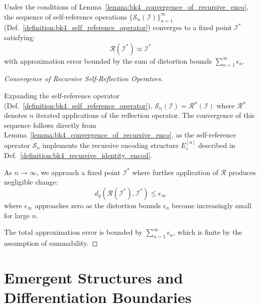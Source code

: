 \begin{theorem}
\label{theorem:bk4_fixed_points_of_self_refere}
Under the conditions of Lemma~\ref{lemma:bk4_convergence_of_recursive_enco}, the sequence of self-reference operations $\{\mathcal{S}_n(\mathcal{I})\}_{n=1}^{\infty}$ (Def.~\ref{definition:bk4_self_reference_operator}) converges to a fixed point $\mathcal{I}^*$ satisfying:
\begin{equation}
    \mathcal{R}(\mathcal{I}^*) \approx \mathcal{I}^*
\end{equation}
with approximation error bounded by the sum of distortion bounds $\sum_{n=1}^{\infty} \epsilon_n$.
\end{theorem}
\begin{proof}[Convergence of Recursive Self-Reflection Operators]
\label{proof:bk4_recursive_reflection_convergence}
\leavevmode

Expanding the self-reference operator (Def.~\ref{definition:bk4_self_reference_operator}), $\mathcal{S}_n(\mathcal{I}) = \mathcal{R}^n(\mathcal{I})$ where $\mathcal{R}^n$ denotes $n$ iterated applications of the reflection operator. The convergence of this sequence follows directly from Lemma~\ref{lemma:bk4_convergence_of_recursive_enco}, as the self-reference operator $\mathcal{S}_n$ implements the recursive encoding structure $E_i^{[n]}$ described in Def.~\ref{definition:bk4_recursive_identity_encod}.

As $n \to \infty$, we approach a fixed point $\mathcal{I}^*$ where further application of $\mathcal{R}$ produces negligible change:
\begin{equation}
    d_g(\mathcal{R}(\mathcal{I}^*), \mathcal{I}^*) \leq \epsilon_{\infty}
\end{equation}
where $\epsilon_{\infty}$ approaches zero as the distortion bounds $\epsilon_n$ become increasingly small for large $n$.

The total approximation error is bounded by $\sum_{n=1}^{\infty} \epsilon_n$, which is finite by the assumption of summability.
\end{proof}
\section{Emergent Structures and Differentiation Boundaries} \label{sec:bk4_emergent_structures_differentiation_boundaries}
